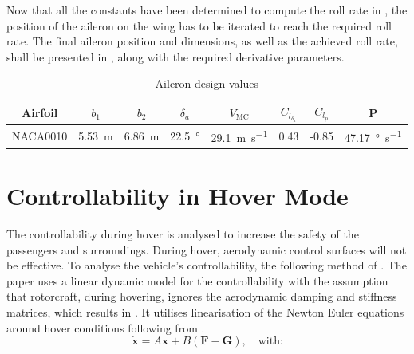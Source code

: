 Now that all the constants have been determined to compute the roll rate in , the position of the aileron on the wing has to be iterated to reach the required roll rate.
The final aileron position and dimensions, as well as the achieved roll rate, shall be presented in , along with the required derivative parameters.
\begin{table}[H]
    \centering
    \caption{Aileron design values}
    \label{tab:aileron_design}
    \begin{tabular}{cccccccc}
        \toprule
        Airfoil & $b_1$ & $b_2$ & $\delta_a$ & $V_\text{MC}$ & $C_{l_{\delta_{\text{a}}}}$ & $C_{l_p}$ & P \\ \midrule
        NACA0010 & \qty{5.53}{m} & \qty{6.86}{m} & \qty{22.5}{\degree} & \qty{29.1}{\meter\per\second} & 0.43 & -0.85 & \qty{47.17}{\degree\per\second} \\ \bottomrule
    \end{tabular}
\end{table}


\section{Controllability in Hover Mode}
\label{sec:Hover_control}
The controllability during hover is analysed to increase the safety of the passengers and surroundings.
During hover, aerodynamic control surfaces will not be effective.
To analyse the vehicle’s controllability, the following method of \textcite{du2015controllability}.
The paper uses a linear dynamic model for the controllability with the assumption that rotorcraft, during hovering, ignores the aerodynamic damping and stiffness matrices, which results in . It utilises linearisation of the Newton Euler equations around hover conditions following from \textcite{pounds2002design}. 
\begin{equation}
\label{eq:dynhovermodel}
    \dot{\mathbf{x}} = A\mathbf{x} + B(\mathbf{F}-\mathbf{G}),\quad \text{with:}
\end{equation}

